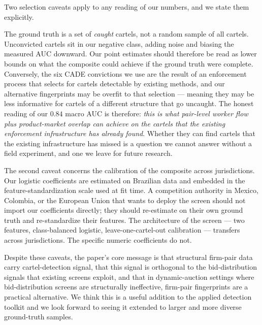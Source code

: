 Two selection caveats apply to any reading of our numbers, and we state them explicitly.

The ground truth is a set of \emph{caught} cartels, not a random sample of all cartels. Unconvicted cartels sit in our negative class, adding noise and biasing the measured AUC downward. Our point estimates should therefore be read as lower bounds on what the composite could achieve if the ground truth were complete. Conversely, the six CADE convictions we use are the result of an enforcement process that selects for cartels detectable by existing methods, and our alternative fingerprints may be overfit to that selection --- meaning they may be less informative for cartels of a different structure that go uncaught. The honest reading of our $0.84$ macro AUC is therefore: \emph{this is what pair-level worker flow plus product-market overlap can achieve on the cartels that the existing enforcement infrastructure has already found}. Whether they can find cartels that the existing infrastructure has missed is a question we cannot answer without a field experiment, and one we leave for future research.

The second caveat concerns the calibration of the composite across jurisdictions. Our logistic coefficients are estimated on Brazilian data and embedded in the feature-standardization scale used at fit time. A competition authority in Mexico, Colombia, or the European Union that wants to deploy the screen should not import our coefficients directly; they should re-estimate on their own ground truth and re-standardize their features. The architecture of the screen --- two features, class-balanced logistic, leave-one-cartel-out calibration --- transfers across jurisdictions. The specific numeric coefficients do not.

Despite these caveats, the paper's core message is that structural firm-pair data carry cartel-detection signal, that this signal is orthogonal to the bid-distribution signals that existing screens exploit, and that in dynamic-auction settings where bid-distribution screens are structurally ineffective, firm-pair fingerprints are a practical alternative. We think this is a useful addition to the applied detection toolkit and we look forward to seeing it extended to larger and more diverse ground-truth samples.
